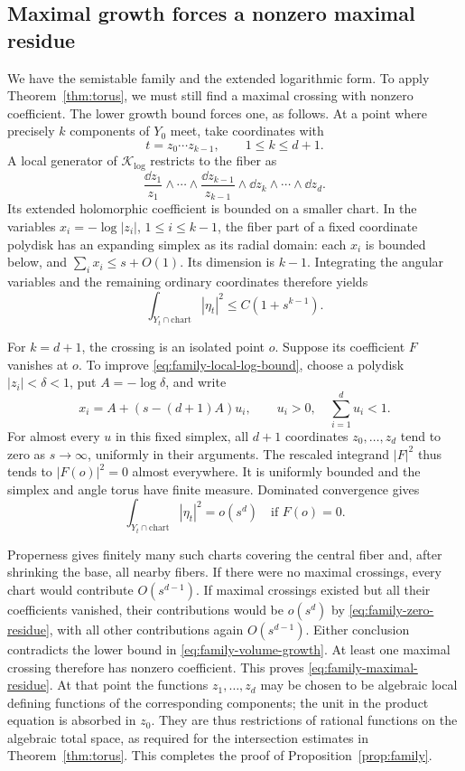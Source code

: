 \subsection{Maximal growth forces a nonzero maximal residue}

We have the semistable family and the extended logarithmic form.
To apply Theorem~\ref{thm:torus}, we must still find a maximal
crossing with nonzero coefficient.  The lower growth bound forces
one, as follows.  At a point where precisely $k$ components of
$Y_0$ meet, take
coordinates with
\[
 t=z_0\cdots z_{k-1},\qquad 1\le k\le d+1.
\]
A local generator of $\mathcal K_{\log}$ restricts to the fiber as
\[
 \frac{\dd z_1}{z_1}\wedge\cdots\wedge
 \frac{\dd z_{k-1}}{z_{k-1}}
 \wedge\dd z_k\wedge\cdots\wedge\dd z_d.
\]
Its extended holomorphic coefficient is bounded on a smaller
chart.  In the variables $x_i=-\log|z_i|$, $1\le i\le k-1$,
the fiber part of a fixed coordinate polydisk has an expanding
simplex as its radial domain: each $x_i$ is bounded below, and
$\sum_i x_i\le s+O(1)$.  Its dimension is $k-1$.  Integrating
the angular variables and the remaining ordinary coordinates
therefore yields
\begin{equation}
 \label{eq:family-local-log-bound}
 \int_{Y_t\cap\text{chart}}|\eta_t|^2
          \le C(1+s^{k-1}).
\end{equation}

For $k=d+1$, the crossing is an isolated point $o$.  Suppose its
coefficient $F$ vanishes at $o$.  To improve
\eqref{eq:family-local-log-bound}, choose a polydisk
$|z_i|<\delta<1$, put $A=-\log\delta$, and write
\[
 x_i=A+(s-(d+1)A)u_i,\qquad
 u_i>0,\quad \sum_{i=1}^d u_i<1.
\]
For almost every $u$ in this fixed simplex, all $d+1$ coordinates
$z_0,\ldots,z_d$ tend to zero as $s\to\infty$, uniformly in
their arguments.  The rescaled integrand $|F|^2$ thus tends to
$|F(o)|^2=0$ almost everywhere.  It is uniformly bounded and the
simplex and angle torus have finite measure.  Dominated convergence
gives
\begin{equation}
 \label{eq:family-zero-residue}
 \int_{Y_t\cap\text{chart}}|\eta_t|^2=o(s^d)
 \quad\text{if }F(o)=0.
\end{equation}

Properness gives finitely many such charts covering the central
fiber and, after shrinking the base, all nearby fibers.  If there
were no maximal crossings, every chart would contribute
$O(s^{d-1})$.  If maximal crossings existed but all their
coefficients vanished, their contributions would be $o(s^d)$
by \eqref{eq:family-zero-residue}, with all other contributions
again $O(s^{d-1})$.  Either conclusion contradicts the lower bound
in \eqref{eq:family-volume-growth}.  At least one maximal crossing
therefore has nonzero coefficient.  This proves
\eqref{eq:family-maximal-residue}.  At that point the functions
$z_1,\ldots,z_d$ may be chosen to be algebraic local defining
functions of the corresponding components; the unit in the
product equation is absorbed in $z_0$.  They are thus restrictions
of rational functions on the algebraic total space, as required
for the intersection estimates in Theorem~\ref{thm:torus}.
This completes the proof of
Proposition~\ref{prop:family}.

